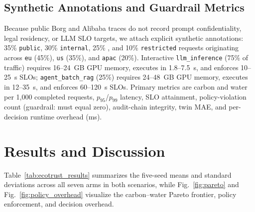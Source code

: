\documentclass[conference]{IEEEtran}
\begin{document}
\subsection{Synthetic Annotations and Guardrail Metrics}
Because public Borg and Alibaba traces do not record prompt confidentiality, legal residency, or LLM SLO targets, we attach explicit synthetic annotations: 35\% \texttt{public}, 30\% \texttt{internal}, 25\% , and 10\% \texttt{restricted} requests originating across \texttt{eu} (45\%), \texttt{us} (35\%), and \texttt{apac} (20\%). Interactive \texttt{llm\_inference} (75\% of traffic) requires 16--24~GB GPU memory, executes in 1.8--7.5~s, and enforces 10--25~s SLOs; \texttt{agent\_batch\_rag} (25\%) requires 24--48~GB GPU memory, executes in 12--35~s, and enforces 60--120~s SLOs. Primary metrics are carbon and water per 1,000 completed requests, $p_{95}$/$p_{99}$ latency, SLO attainment, policy-violation count (guardrail: must equal zero), audit-chain integrity, twin MAE, and per-decision runtime overhead (ms).

\section{Results and Discussion}
\label{sec:results}

Table~\ref{tab:ecotrust_results} summarizes the five-seed means and standard deviations across all seven arms in both scenarios, while Fig.~\ref{fig:pareto} and Fig.~\ref{fig:policy_overhead} visualize the carbon--water Pareto frontier, policy enforcement, and decision overhead.
\end{document}
